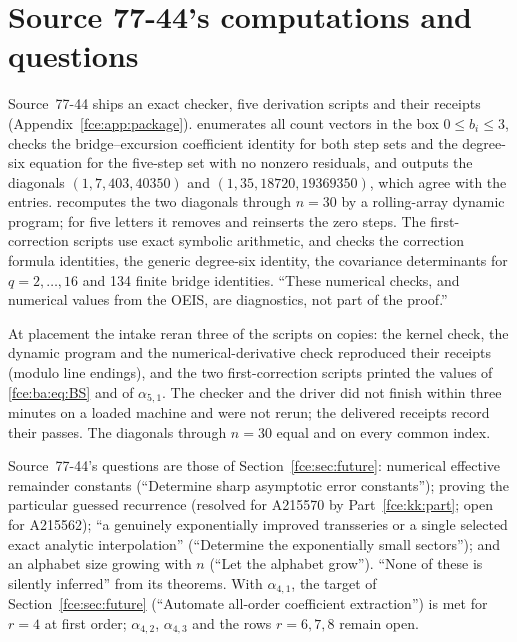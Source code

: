 \documentclass[11pt,a4paper]{article}
\numberwithin{equation}{section}
\theoremstyle{definition}\newtheorem{definition}[theorem]{Definition}
\theoremstyle{remark}\newtheorem{remark}[theorem]{Remark}
\begin{document}
\section{Source 77-44's computations and questions}\label{fce:ba:sec:checks}
Source~77-44 ships an exact checker, five derivation scripts and their
receipts (Appendix~\ref{fce:app:package}). 
enumerates all count vectors in the box $0\le b_i\le3$, checks the
bridge--excursion coefficient identity for both step sets and the
degree-six equation for the five-step set with no nonzero residuals, and
outputs the diagonals $(1,7,403,40350)$ and $(1,35,18720,19369350)$, which
agree with the entries. 
recomputes the two diagonals through $n=30$ by a rolling-array dynamic
program; for five letters it removes and reinserts the zero steps. The
first-correction scripts use exact symbolic arithmetic, and
 checks the correction formula identities, the
generic degree-six identity, the covariance determinants for
$q=2,\ldots,16$ and 134 finite bridge identities. ``These numerical checks,
and numerical values from the OEIS, are diagnostics, not part of the
proof.''

At placement the intake reran three of the scripts on copies: the kernel
check, the dynamic program and the numerical-derivative check reproduced
their receipts (modulo line endings), and the two first-correction scripts
printed the values of \eqref{fce:ba:eq:BS} and of $\alpha_{5,1}$. The
checker  and the driver
 did not finish within three minutes on a
loaded machine and were not rerun; the delivered receipts record their
passes. The diagonals through $n=30$ equal
 and
 on every common index.

Source~77-44's questions are those of Section~\ref{fce:sec:future}:
numerical effective remainder constants (``Determine sharp asymptotic error
constants''); proving the particular guessed recurrence (resolved for
A215570 by Part~\ref{fce:kk:part}; open for A215562); ``a genuinely
exponentially improved transseries or a single selected exact analytic
interpolation'' (``Determine the exponentially small sectors''); and an
alphabet size growing with $n$ (``Let the alphabet grow''). ``None of these
is silently inferred'' from its theorems. With $\alpha_{4,1}$, the target of
Section~\ref{fce:sec:future} (``Automate all-order coefficient extraction'')
is met for $r=4$ at first order; $\alpha_{4,2}$, $\alpha_{4,3}$ and the rows
$r=6,7,8$ remain open.
\end{document}

